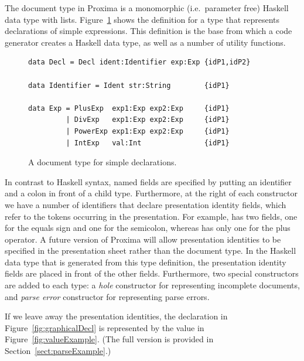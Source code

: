 \documentclass{article}[10pt]
\begin{document}
The document type in Proxima is a monomorphic (i.e.\ parameter free) Haskell data type with lists. Figure~\ref{fig:docType} shows the definition for a type  that represents declarations of simple expressions. This definition is the base from which a code generator creates a Haskell data type, as well as a number of utility functions.

\begin{figure}
\begin{center}
\begin{footnotesize}
\begin{verbatim}
data Decl = Decl ident:Identifier exp:Exp {idP1,idP2}

data Identifier = Ident str:String        {idP1}

data Exp = PlusExp  exp1:Exp exp2:Exp     {idP1}
         | DivExp   exp1:Exp exp2:Exp     {idP1}
         | PowerExp exp1:Exp exp2:Exp     {idP1}
         | IntExp   val:Int               {idP1}
\end{verbatim}
\end{footnotesize}
\end{center}
\caption{A document type for simple declarations.} \label{fig:docType} 
\end{figure}

In contrast to Haskell syntax, named fields are specified by putting an identifier and a colon in front of a child type. Furthermore, at the right of each constructor we have a number of identifiers that declare presentation identity fields, which refer to the tokens occurring in the presentation. For example,  has two fields, one for the equals sign and one for the semicolon, whereas  has only one for the plus operator. A future version of Proxima will allow presentation identities to be specified in the presentation sheet rather than the document type. In the Haskell data type that is generated from this type definition, the presentation identity fields are placed in front of the other fields. Furthermore, two special constructors are added to each type: a {\em hole} constructor for representing incomplete documents, and  {\em parse error} constructor for representing parse errors.

If we leave away the presentation identities, the declaration in Figure~\ref{fig:graphicalDecl} is represented by the value in Figure~\ref{fig:valueExample}. (The full version is provided in Section~\ref{sect:parseExample}.)
\end{document}
